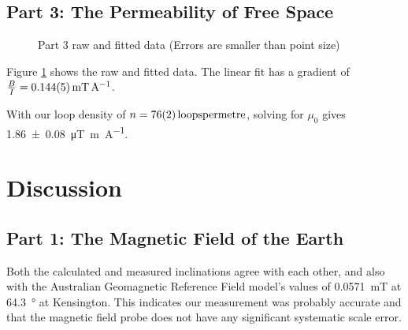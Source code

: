 \documentclass[a4paper]{scrartcl}
\begin{document}
\subsection{Part 3: The Permeability of Free Space}
\begin{figure}
    \centering
    \caption{Part 3 raw and fitted data (Errors are smaller than point size)}
    \label{fig:part3_graph}
\end{figure}

Figure \ref{fig:part3_graph} shows the raw and fitted data. The linear fit has a gradient of \(\frac{B}{I} = \SI{0.144 \pm 0.005}{\milli\tesla\per\ampere}\).

With our loop density of \(n = \SI{76 \pm 2}{loops per metre}\), solving for \(\mu_0\) gives \SI{1.86 \pm 0.08}{\micro\tesla\metre\per\ampere}.

\section{Discussion}
\subsection{Part 1: The Magnetic Field of the Earth}
Both the calculated and measured inclinations agree with each other, and also with the Australian Geomagnetic Reference Field model's values of \SI{0.0571}{\milli\tesla} at \SI{64.3}{\degree} at Kensington. This indicates our measurement was probably accurate and that the magnetic field probe does not have any significant systematic scale error.
\end{document}
